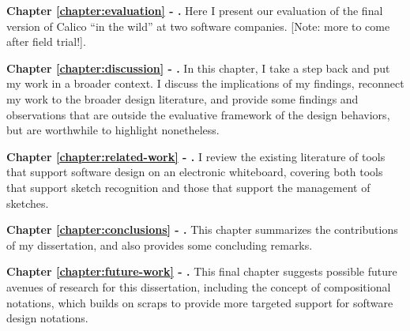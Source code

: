 \textbf{Chapter \ref{chapter:evaluation} - .} Here I present our evaluation of the final version of Calico ``in the wild'' at two software companies. [Note: more to come after field trial!].

\textbf{Chapter \ref{chapter:discussion} - .} In this chapter, I take a step back and put my work in a broader context. I discuss the implications of my findings, reconnect my work to the broader design literature, and provide some findings and observations that are outside the evaluative framework of the design behaviors, but are worthwhile to highlight nonetheless. 

\textbf{Chapter \ref{chapter:related-work} - .} I review the existing literature of tools that support software design on an electronic whiteboard, covering both tools that support sketch recognition and those that support the management of sketches.

\textbf{Chapter \ref{chapter:conclusions} - .} This chapter summarizes the contributions of my dissertation, and also provides some concluding remarks.

\textbf{Chapter \ref{chapter:future-work} - .} This final chapter suggests possible future avenues of research for this dissertation, including the concept of compositional notations, which builds on scraps to provide more targeted support for software design notations.

